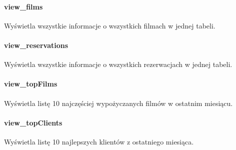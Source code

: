 \documentclass[12pt,a4paper,titlepage]{article}
\begin{document}
\paragraph{view\_films}
Wyświetla wszystkie informacje o wszystkich filmach w jednej tabeli.

\paragraph{view\_reservations}
Wyświetla wszystkie informacje o wszystkich rezerwacjach w jednej tabeli.

\paragraph{view\_topFilms}
Wyświetla listę 10 najczęściej wypożyczanych filmów w ostatnim miesiącu.

\paragraph{view\_topClients}
Wyświetla listę 10 najlepszych klientów z ostatniego miesiąca.
\end{document}
